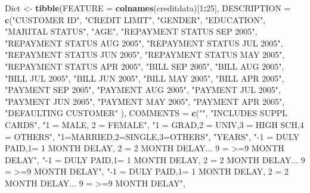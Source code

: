 \documentclass[]{article}
\newenvironment{Shaded}{\begin{snugshade}}{\end{snugshade}}
\newcommand{\DataTypeTok}[1]{\textcolor[rgb]{0.13,0.29,0.53}{#1}}
\newcommand{\DecValTok}[1]{\textcolor[rgb]{0.00,0.00,0.81}{#1}}
\newcommand{\KeywordTok}[1]{\textcolor[rgb]{0.13,0.29,0.53}{\textbf{#1}}}
\newcommand{\NormalTok}[1]{#1}
\newcommand{\OperatorTok}[1]{\textcolor[rgb]{0.81,0.36,0.00}{\textbf{#1}}}
\newcommand{\StringTok}[1]{\textcolor[rgb]{0.31,0.60,0.02}{#1}}
\begin{document}
\begin{Shaded}
\begin{Highlighting}[]
{{\NormalTok{Dict <-}\StringTok{ }\KeywordTok{tibble}\NormalTok{(}\DataTypeTok{FEATURE =} \KeywordTok{colnames}\NormalTok{(creditdata)[}\DecValTok{1}\OperatorTok{:}\DecValTok{25}\NormalTok{],}
               \DataTypeTok{DESCRIPTION =}
                 \KeywordTok{c}\NormalTok{(}\StringTok{"CUSTOMER ID"}\NormalTok{,}
                   \StringTok{"CREDIT LIMIT"}\NormalTok{,}
                   \StringTok{"GENDER"}\NormalTok{,}
                   \StringTok{"EDUCATION"}\NormalTok{,}
                   \StringTok{"MARITAL STATUS"}\NormalTok{,}
                   \StringTok{"AGE"}\NormalTok{,}
                   \StringTok{"REPAYMENT STATUS SEP 2005"}\NormalTok{,}
                   \StringTok{"REPAYMENT STATUS AUG 2005"}\NormalTok{,}
                   \StringTok{"REPAYMENT STATUS JUL 2005"}\NormalTok{,}
                   \StringTok{"REPAYMENT STATUS JUN 2005"}\NormalTok{,}
                   \StringTok{"REPAYMENT STATUS MAY 2005"}\NormalTok{,}
                   \StringTok{"REPAYMENT STATUS APR 2005"}\NormalTok{,}
                   \StringTok{"BILL SEP 2005"}\NormalTok{,}
                   \StringTok{"BILL AUG 2005"}\NormalTok{,}
                   \StringTok{"BILL JUL 2005"}\NormalTok{,}
                   \StringTok{"BILL JUN 2005"}\NormalTok{,}
                   \StringTok{"BILL MAY 2005"}\NormalTok{,}
                   \StringTok{"BILL APR 2005"}\NormalTok{,}
                   \StringTok{"PAYMENT SEP 2005"}\NormalTok{,}
                   \StringTok{"PAYMENT AUG 2005"}\NormalTok{,}
                   \StringTok{"PAYMENT JUL 2005"}\NormalTok{,}
                   \StringTok{"PAYMENT JUN 2005"}\NormalTok{,}
                   \StringTok{"PAYMENT MAY 2005"}\NormalTok{,}
                   \StringTok{"PAYMENT APR 2005"}\NormalTok{,}
                   \StringTok{"DEFAULTING CUSTOMER"}
\NormalTok{                  ),}
               \DataTypeTok{COMMENTS =} 
                 \KeywordTok{c}\NormalTok{(}\StringTok{""}\NormalTok{,}
                   \StringTok{"INCLUDES SUPPL CARDS"}\NormalTok{,}
                   \StringTok{"1 = MALE, 2 = FEMALE"}\NormalTok{,}
                   \StringTok{"1 = GRAD,2 = UNIV,3 = HIGH SCH,4 = OTHERS"}\NormalTok{,}
                   \StringTok{"1=MARRIED,2=SINGLE,3=OTHERS"}\NormalTok{,}
                   \StringTok{"YEARS"}\NormalTok{,}
                   \StringTok{"-1 = DULY PAID,1= 1 MONTH DELAY, 2 = 2 MONTH DELAY... 9 = >=9 MONTH DELAY"}\NormalTok{,}
                   \StringTok{"-1 = DULY PAID,1= 1 MONTH DELAY, 2 = 2 MONTH DELAY... 9 = >=9 MONTH DELAY"}\NormalTok{,}
                   \StringTok{"-1 = DULY PAID,1= 1 MONTH DELAY, 2 = 2 MONTH DELAY... 9 = >=9 MONTH DELAY"}\NormalTok{,}
}}
\end{Highlighting}
\end{Shaded}
\end{document}
